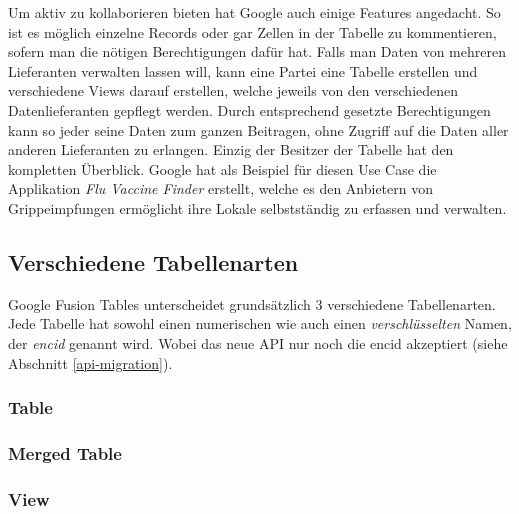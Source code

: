 Um aktiv zu kollaborieren bieten hat Google auch einige Features angedacht. So ist es möglich einzelne Records oder gar Zellen in der Tabelle zu kommentieren, sofern man die nötigen Berechtigungen dafür hat. Falls man Daten von mehreren Lieferanten verwalten lassen will, kann eine Partei eine Tabelle erstellen und verschiedene Views darauf erstellen, welche jeweils von den verschiedenen Datenlieferanten gepflegt werden. Durch entsprechend gesetzte Berechtigungen kann so jeder seine Daten zum ganzen Beitragen, ohne Zugriff auf die Daten aller anderen Lieferanten zu erlangen. Einzig der Besitzer der Tabelle hat den kompletten Überblick. Google hat als Beispiel für diesen Use Case die Applikation \emph{Flu Vaccine Finder} erstellt, welche es den Anbietern von Grippeimpfungen ermöglicht ihre Lokale selbstständig zu erfassen und verwalten.\cite{data-gathering}

\subsection{Verschiedene Tabellenarten}
Google Fusion Tables unterscheidet grundsätzlich 3 verschiedene Tabellenarten. Jede Tabelle hat sowohl einen numerischen wie auch einen \emph{verschlüsselten} Namen, der \emph{encid} genannt wird. Wobei das neue API nur noch die encid akzeptiert (siehe Abschnitt \ref{api-migration}). 

\subsubsection{Table}

\subsubsection{Merged Table}

\subsubsection{View}











